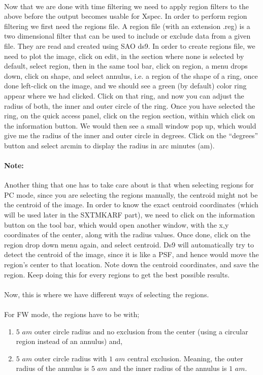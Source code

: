 \documentclass[a4paper,twoside]{report}
\numberwithin{equation}{section}
\begin{document}
\paragraph{}
Now that we are done with time filtering we need to apply region filters to the above before the output becomes usable for Xspec. In order to perform region filtering we first need the regions file. A region file (with an extension .reg) is a two dimensional filter that can be used to include or exclude data from a given file. They are read and created using SAO ds9. In order to create regions file, we need to plot the image, click on edit, in the section where none is selected by default, select region, then in the same tool bar, click on region, a menu drops down, click on shape, and select annulus, i.e. a region of the shape of a ring, once done left-click on the image, and we should see a green (by default) color ring appear where we had clicked. Click on that ring, and now you can adjust the radius of both, the inner and outer circle of the ring. Once you have selected the ring, on the quick access panel, click on the region section, within which click on the information button. We would then see a small window pop up, which would give me the radius of the inner and outer circle in degrees. Click on the “degrees” button and select arcmin to display the radius in arc minutes (am). 
\paragraph{Note:}
Another thing that one has to take care about is that when selecting regions for PC mode, since you are selecting the regions manually, the centroid might not be the centroid of the image. In order to know the exact centroid coordinates (which will be used later in the SXTMKARF part), we need to click on the information button on the tool bar, which would open another window, with the x,y coordinates of the center, along with the radius values. Once done, click on the region drop down menu again, and select centroid. Ds9 will automatically try to detect the centroid of the image, since it is like a PSF, and hence would move the region's center to that location. Note down the centroid coordinates, and save the region. Keep doing this for every regions to get the best possible results.
\paragraph{}
Now, this is where we have different ways of selecting the regions. 
\paragraph{}
For FW mode, the regions have to be with;
\begin{enumerate}
\item $5$ $am$ outer circle radius and no exclusion from the center (using a circular region instead of an annulus) and,
\item $5$ $am$ outer circle radius with $1$ $am$ central exclusion. Meaning, the outer radius of the annulus is $5$ $am$ and the inner radius of the annulus is $1$ $am$.
\end{enumerate}
\end{document}
